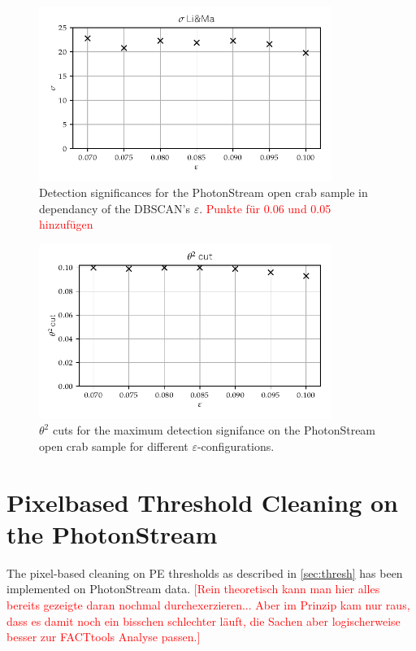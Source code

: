 \begin{figure}
  \centering
  \includegraphics[width=0.85\textwidth]{Plots/Epsilon/eps_sigma.pdf}
  \caption{Detection significances for the PhotonStream open crab sample in dependancy of the DBSCAN's $\varepsilon$. \textcolor{red}{Punkte für 0.06 und 0.05 hinzufügen}}
  \label{fig:eps_sigma}
\end{figure}
%
\begin{figure}
  \centering
  \includegraphics[width=0.85\textwidth]{Plots/Epsilon/eps_theta_cut.pdf}
  \caption{$\theta^2$ cuts for the maximum detection signifance on the PhotonStream open crab sample for different $\varepsilon$-configurations.}
  \label{fig:eps_theta}
\end{figure}

\section{Pixelbased Threshold Cleaning on the PhotonStream}
%
The pixel-based cleaning on PE thresholds as described in \autoref{sec:thresh}
has been implemented on PhotonStream data. \textcolor{red}{[Rein theoretisch kann man hier alles bereits gezeigte daran nochmal durchexerzieren... Aber im Prinzip kam nur raus, dass es damit noch ein bisschen schlechter läuft, die Sachen aber logischerweise besser zur FACTtools Analyse passen.]}
